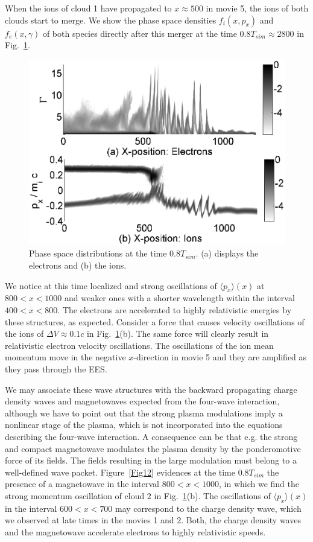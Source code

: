 \documentclass[structabstract]{aa}
\begin{document}
When the ions of cloud 1 have propagated to $x\approx 500$ in movie 5, the 
ions of both clouds start to merge. We show the phase space densities 
$f_i (x,p_x)$ and $f_e (x,\gamma)$ of both species directly after this 
merger at the time $0.8T_{sim} \approx 2800$ in Fig.~\ref{Fig17}. 
\begin{figure}
\centering
\includegraphics[width=\columnwidth]{Fig17.eps}
\caption{Phase space distributions at the time $0.8 T_{sim}$. (a) 
displays the electrons and (b) the ions.}\label{Fig17}
\end{figure}
We notice at this time localized and strong oscillations of $\langle p_x 
\rangle (x)$ at $800 < x < 1000$ and weaker ones with a shorter wavelength
within the interval $400 < x < 800$. The electrons are accelerated to highly 
relativistic energies by these structures, as expected. Consider a 
force that causes velocity oscillations of the ions of $\Delta V \approx 
0.1c$ in Fig.~\ref{Fig17}(b). The same force will clearly result in 
relativistic electron velocity oscillations. The oscillations of the ion 
mean momentum move in the negative $x$-direction in movie 5 and they are 
amplified as they pass through the EES. 

We may associate these wave structures with the backward propagating charge 
density waves and magnetowaves expected from the four-wave interaction, 
although we have to point out that the strong plasma modulations imply a 
nonlinear stage of the plasma, which is not incorporated into the equations 
describing the four-wave interaction. A consequence can be that e.g. the 
strong and compact magnetowave modulates the plasma density by the 
ponderomotive force of its fields. The fields resulting in the large 
modulation must belong to a well-defined wave packet. Figure~\ref{Fig12} 
evidences at the time $0.8T_{sim}$ the presence of a magnetowave in the 
interval $800 < x < 1000$, in which we find the strong momentum oscillation 
of cloud 2 in Fig.~\ref{Fig17}(b). The oscillations of $\langle p_x \rangle 
(x)$ in the interval $600 < x < 700$ may correspond to the charge density 
wave, which we observed at late times in the movies 1 and 2. Both, the charge 
density waves and the magnetowave accelerate electrons to highly relativistic 
speeds.
\end{document}
